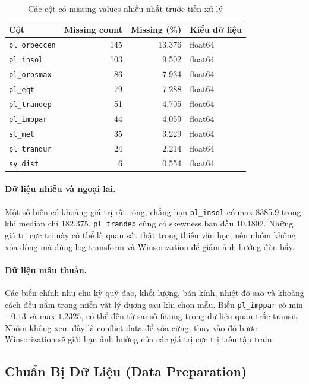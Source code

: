 \begin{table}[H]
\centering
\caption{Các cột có missing values nhiều nhất trước tiền xử lý}
\label{tab:part2_missing_eda}
\begin{tabular}{@{}lrrl@{}}
\hline
\textbf{Cột} & \textbf{Missing count} & \textbf{Missing (\%)} & \textbf{Kiểu dữ liệu} \\
\hline
\texttt{pl\_orbeccen} & 145 & 13.376 & float64 \\
\texttt{pl\_insol} & 103 & 9.502 & float64 \\
\texttt{pl\_orbsmax} & 86 & 7.934 & float64 \\
\texttt{pl\_eqt} & 79 & 7.288 & float64 \\
\texttt{pl\_trandep} & 51 & 4.705 & float64 \\
\texttt{pl\_imppar} & 44 & 4.059 & float64 \\
\texttt{st\_met} & 35 & 3.229 & float64 \\
\texttt{pl\_trandur} & 24 & 2.214 & float64 \\
\texttt{sy\_dist} & 6 & 0.554 & float64 \\
\hline
\end{tabular}
\end{table}

\paragraph{Dữ liệu nhiễu và ngoại lai.}
Một số biến có khoảng giá trị rất rộng, chẳng hạn \texttt{pl\_insol} có max 8385.9 trong khi median
chỉ 182.375. \texttt{pl\_trandep} cũng có skewness ban đầu 10.1802. Những giá trị cực trị này có
thể là quan sát thật trong thiên văn học, nên nhóm không xóa dòng mà dùng log-transform và
Winsorization để giảm ảnh hưởng đòn bẩy.

\paragraph{Dữ liệu mâu thuẫn.}
Các biến chính như chu kỳ quỹ đạo, khối lượng, bán kính, nhiệt độ sao và khoảng cách đều nằm trong
miền vật lý dương sau khi chọn mẫu. Biến \texttt{pl\_imppar} có min $-0.13$ và max $1.2325$, có thể
đến từ sai số fitting trong dữ liệu quan trắc transit. Nhóm không xem đây là conflict data để xóa
cứng; thay vào đó bước Winsorization sẽ giới hạn ảnh hưởng của các giá trị cực trị trên tập train.

\subsection{Chuẩn Bị Dữ Liệu (Data Preparation)}

